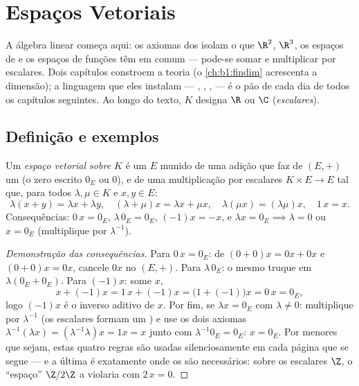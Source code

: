 \chapter{Espaços Vetoriais}\label{ch:b1:vspaces}

A álgebra linear começa aqui: os axiomas dos  isolam
o que $\R^2$, $\R^3$, os espaços de  e os espaços de funções
têm em comum --- pode-se somar e multiplicar por escalares. Dois
capítulos constroem a teoria (o \cref{ch:b1:findim} acrescenta a dimensão); a
linguagem que eles instalam --- , , ,
 --- é o pão de cada dia de todos os capítulos seguintes.
Ao longo do texto, $K$ designa $\R$ ou $\C$ (\emph{escalares}).

\section{Definição e exemplos}

\begin{definition}\label{def:b1:vspaces:def}
Um \emph{espaço vetorial sobre $K$} é um
 $E$ munido de uma adição que faz de $(E, +)$ um  (o zero escrito $0_E$ ou $0$), e de uma multiplicação por
escalares $K \times E \to E$ tal que, para todos $\lambda, \mu \in K$ e $x, y \in E$:
\[
\lambda(x + y) = \lambda x + \lambda y,\quad
(\lambda + \mu) x = \lambda x + \mu x,\quad
\lambda(\mu x) = (\lambda\mu) x,\quad
1\,x = x .
\]
Consequências: $0\,x = 0_E$, $\lambda\,0_E = 0_E$, $(-1)x = -x$, e
$\lambda x = 0_E \implies \lambda = 0$ ou $x = 0_E$ (multiplique por
$\lambda^{-1}$).
\end{definition}

\begin{proof}[Demonstração das consequências]
Para $0\,x = 0_E$: de $(0 + 0)x = 0x + 0x$ e $(0+0)x = 0x$,
cancele $0x$ no  $(E, +)$. Para $\lambda\,0_E$: o mesmo
truque em $\lambda(0_E + 0_E)$. Para $(-1)x$: some $x$,
\[
x + (-1)x = 1\,x + (-1)x = \bigl(1 + (-1)\bigr)x = 0\,x = 0_E ,
\]
logo $(-1)x$ é o inverso aditivo de $x$. Por fim, se $\lambda x
= 0_E$ com $\lambda \neq 0$:
multiplique por $\lambda^{-1}$ (os escalares formam um ) e use os dois
axiomas $\lambda^{-1}(\lambda x) = (\lambda^{-1}\lambda)x = 1x = x$
junto com $\lambda^{-1}0_E = 0_E$: $x = 0_E$. Por menores que sejam,
estas quatro regras são usadas silenciosamente em cada página que se
segue --- e a última é exatamente onde os  são necessários:
sobre os escalares $\Z$, o ``espaço'' $\Z/2\Z$ a violaria
com $2\,x = 0$.
\end{proof}

